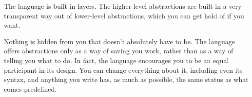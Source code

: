 The language is built in layers. The higher-level abstractions are built
in a very transparent way out of lower-level abstractions, which you can
get hold of if you want.

Nothing is hidden from you that doesn't absolutely have to be. The
language offers abstractions only as a way of saving you work, rather
than as a way of telling you what to do. In fact, the language
encourages you to be an equal participant in its design. You can change
everything about it, including even its syntax, and anything you write
has, as much as possible, the same status as what comes predefined.
